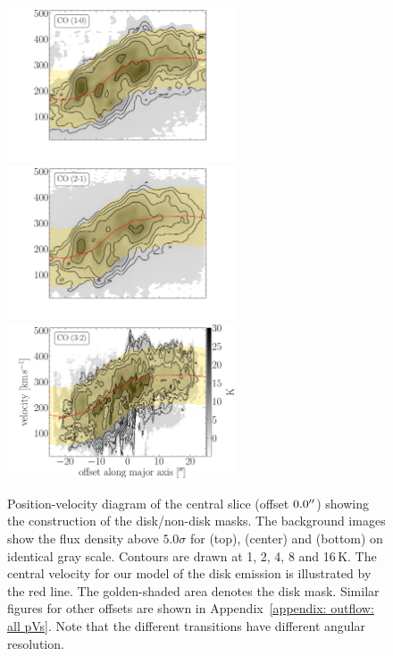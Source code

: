 \begin{figure}
	\centering
	\includegraphics[width=0.6\textwidth]{images/chapters/papers/outflow/outflow_fig5a.pdf}
	\includegraphics[width=0.6\textwidth]{images/chapters/papers/outflow/outflow_fig5b.pdf}
	\includegraphics[width=0.6\textwidth]{images/chapters/papers/outflow/outflow_fig5c.pdf}
	\caption[Sample pV slices]{Position-velocity diagram of the central slice (offset $0.0^{\prime\prime}$) showing the construction of the disk/non-disk masks. The background images show the flux density above $5.0 \sigma$ for  (top),  (center) and  (bottom) on identical gray scale. Contours are drawn at 1, 2, 4, 8 and 16\,K. The central velocity for our model of the disk emission is illustrated by the red line. The golden-shaded area denotes the disk mask. Similar figures for other offsets are shown in Appendix~\ref{appendix: outflow: all pVs}. Note that the different transitions have different angular resolution.}
	\label{outflow: figure: sample slice}
\end{figure}


